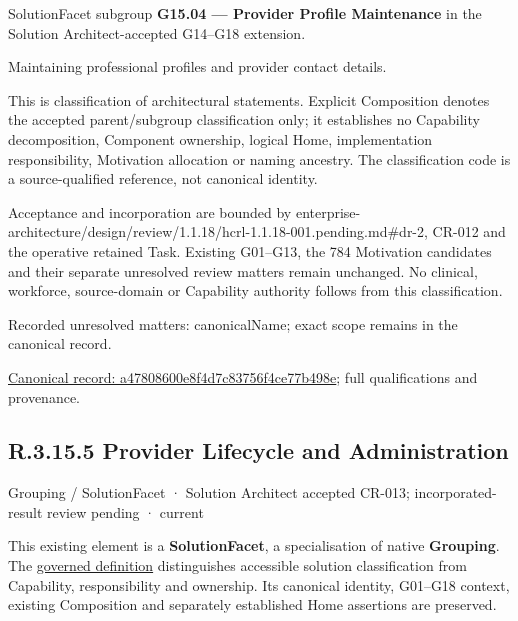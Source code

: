 SolutionFacet subgroup \textbf{G15.04 — Provider Profile Maintenance} in the Solution Architect-accepted G14–G18 extension.



Maintaining professional profiles and provider contact details.



This is classification of architectural statements. Explicit Composition denotes the accepted parent/subgroup classification only; it establishes no Capability decomposition, Component ownership, logical Home, implementation responsibility, Motivation allocation or naming ancestry. The classification code is a source-qualified reference, not canonical identity.



Acceptance and incorporation are bounded by enterprise-architecture/design/review/1.1.18/hcrl-1.1.18-001.pending.md\#dr-2, CR-012 and the operative retained Task. Existing G01–G13, the 784 Motivation candidates and their separate unresolved review matters remain unchanged. No clinical, workforce, source-domain or Capability authority follows from this classification.


{\small Recorded unresolved matters: canonicalName; exact scope remains in the canonical record.}\par
{\footnotesize \href{../../../../../../../continuum/grouping/a47808600e8f4d7c83756f4ce77b498e.md}{Canonical record: a47808600e8f4d7c83756f4ce77b498e}; full qualifications and provenance.}\par
\subsection*{R.3.15.5 Provider Lifecycle and Administration}
\label{navigation:R.3.15.5}

\label{element:ad16265c76114f4eaddf75b0be2d4755}
{\small Grouping / SolutionFacet · Solution Architect accepted CR-013; incorporated-result review pending · current}\par

This existing element is a \textbf{SolutionFacet}, a specialisation of native
\textbf{Grouping}. The \href{\detokenize{../../../../../../../governance/continuum-representation.md#solutionfacet-classification--1119-candidate}}{governed definition}
distinguishes accessible solution classification from Capability, responsibility
and ownership. Its canonical identity, G01–G18 context, existing Composition
and separately established Home assertions are preserved.



